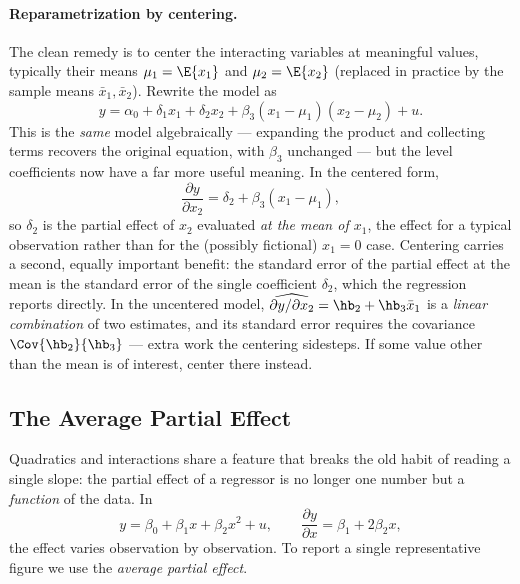 \paragraph{Reparametrization by centering.} The clean remedy is to center the interacting variables at meaningful values, typically their means $\mu_1 = \E{x_1}$ and $\mu_2 = \E{x_2}$ (replaced in practice by the sample means $\bar x_1, \bar x_2$). Rewrite the model as
\[
y = \alpha_0 + \delta_1 x_1 + \delta_2 x_2 + \beta_3 (x_1 - \mu_1)(x_2 - \mu_2) + u .
\]
This is the \emph{same} model algebraically --- expanding the product and collecting terms recovers the original equation, with $\beta_3$ unchanged --- but the level coefficients now have a far more useful meaning. In the centered form,
\[
\frac{\partial y}{\partial x_2} = \delta_2 + \beta_3 (x_1 - \mu_1),
\]
so $\delta_2$ is the partial effect of $x_2$ evaluated \emph{at the mean of $x_1$}, the effect for a typical observation rather than for the (possibly fictional) $x_1=0$ case. Centering carries a second, equally important benefit: the standard error of the partial effect at the mean is the standard error of the single coefficient $\delta_2$, which the regression reports directly. In the uncentered model, $\widehat{\partial y/\partial x_2} = \hb_2 + \hb_3 \bar x_1$ is a \emph{linear combination} of two estimates, and its standard error requires the covariance $\Cov{\hb_2}{\hb_3}$ --- extra work the centering sidesteps. If some value other than the mean is of interest, center there instead.

\subsection{The Average Partial Effect}

Quadratics and interactions share a feature that breaks the old habit of reading a single slope: the partial effect of a regressor is no longer one number but a \emph{function} of the data. In
\[
y = \beta_0 + \beta_1 x + \beta_2 x^2 + u,
\qquad
\frac{\partial y}{\partial x} = \beta_1 + 2\beta_2 x ,
\]
the effect varies observation by observation. To report a single representative figure we use the \emph{average partial effect}.


